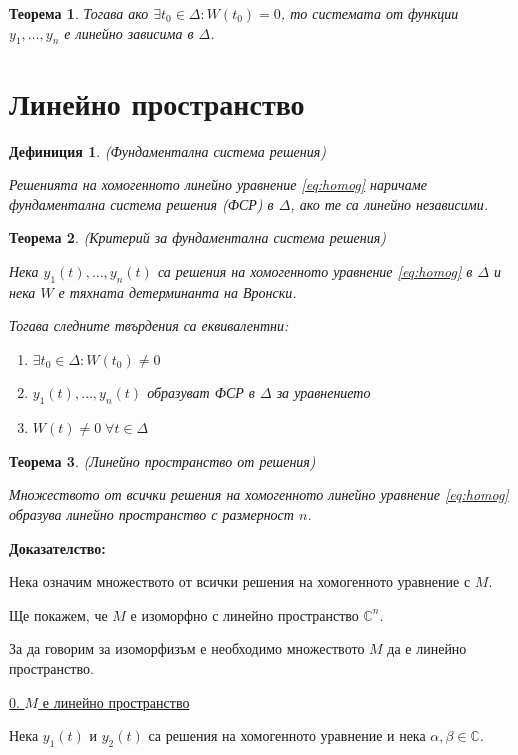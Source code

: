 \documentclass{scrartcl}
\newtheorem{theorem}{Теорема}
\newtheorem{definition}{Дефиниция}
\begin{document}
\begin{FlushLeft}
\begin{theorem}
Тогава ако $\exists t_0 \in \Delta : W(t_0) = 0$, то системата от функции $y_1, \dots, y_n$ е линейно зависима в $\Delta$.
\end{theorem}

\section{Линейно пространство}

\begin{definition}
(Фундаментална система решения)

Решенията на хомогенното линейно уравнение \eqref{eq:homog} наричаме фундаментална система решения (ФСР) в $\Delta$, ако те са линейно независими.
\end{definition}

\begin{theorem}
(Критерий за фундаментална система решения)

Нека $y_1(t), \dots, y_n(t)$ са решения на хомогенното уравнение \eqref{eq:homog} в $\Delta$ и нека $W$ е тяхната детерминанта на Вронски.

Тогава следните твърдения са еквивалентни:

\begin{enumerate}
    \item $\exists t_0 \in \Delta : W(t_0) \ne 0$
    \item $y_1(t), \dots, y_n(t)$ образуват ФСР в $\Delta$ за уравнението
    \item $W(t) \ne 0 \; \forall t \in \Delta$
\end{enumerate}
\end{theorem}

\begin{theorem}
(Линейно пространство от решения)

Множеството от всички решения на хомогенното линейно уравнение \eqref{eq:homog} образува линейно пространство с размерност $n$.
\end{theorem}

\textbf{Доказателство:}

Нека означим множеството от всички решения на хомогенното уравнение с $M$.

Ще покажем, че $M$ е изоморфно с линейно пространство $\mathbb{C}^n$.

За да говорим за изоморфизъм е необходимо множеството $M$ да е линейно пространство.

\underline{0. $M$ е линейно пространство}

Нека $y_1(t)$ и $y_2(t)$ са решения на хомогенното уравнение и нека $\alpha, \beta \in \mathbb{C}$.


\end{FlushLeft}
\end{document}

